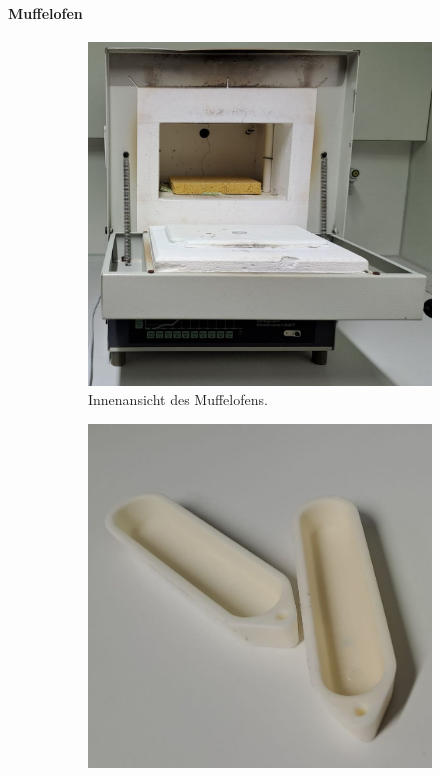 \paragraph{Muffelofen}
\begin{figure}
    \centering
    \begin{subfigure}[t]{0.35\textwidth}
        \centering
        \includegraphics[width=\textwidth]{../assets/messmethoden/heiz/ofen}
        \caption{Innenansicht des Muffelofens.}
        \label{fig:muffelofen}
    \end{subfigure}
    \begin{subfigure}[t]{0.35\textwidth}
        \centering
        \includegraphics[width=\textwidth]{../assets/messmethoden/heiz/schale}

\end{subfigure}
\end{figure}
